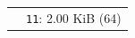 \scriptsize
\setlength{\tabcolsep}{2pt}
\renewcommand{\arraystretch}{1.05}
\begin{tabular}{@{}l l@{}}
\definecolor{c0_215_255}{RGB}{0,215,255}
\colorbox{c0_215_255}{\phantom{Xg}} & \texttt{11}: 2.00 KiB (64) \\
\end{tabular}